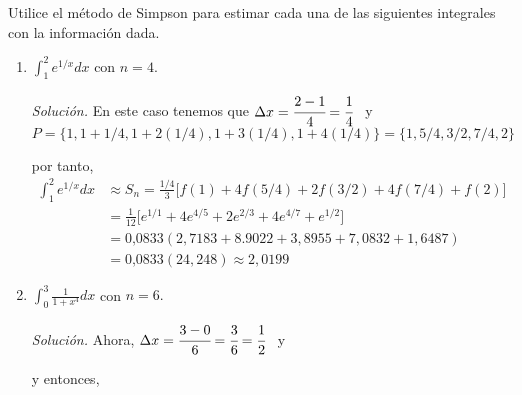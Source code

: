 \begin{ejemplo}
\textnormal{Utilice el método de Simpson para estimar cada una de las siguientes integrales con la información dada.}
\end{ejemplo}
\begin{enumerate}[leftmargin=1.2em,   itemindent=0pt,       labelwidth=\labelwidth,labelsep=0.5em,]
	
\item $\displaystyle\int_{1}^{2}e^{1/x}dx$ con $n=4.$

\textit{Solución.} En este caso tenemos que $\Delta x=\cfrac{2-1}{4}=\cfrac{1}{4}$ \ y
{\small
\[
P=\{1,1+1/4,1+2(1/4),1+3(1/4),1+4(1/4)\}=\{1,5/4,3/2,7/4,2\}
\]
}

por tanto,
{\small
\begin{align*}
\int_{1}^{2}e^{1/x}dx&\approx S_{n}=\frac{1/4}{3}\Big[
f(1)+4f(5/4)+2f(3/2)+4f(7/4)+f(2)\Big]\\
&=\frac{1}{12}\Big[ e^{1/1}+4e^{4/5}+2e^{2/3}+4e^{4/7}+e^{1/2}\Big]\\
&=0\text{,}0833(2,\allowbreak 7183+8.\allowbreak9022+3,\allowbreak 8955+7,\allowbreak 0832+1,\allowbreak 6487)\\
&=0\text{,}0833(24,\allowbreak 248)\approx\allowbreak 2,0199
\end{align*}
}

\item $\displaystyle\int_{0}^{3}\frac{1}{1+x^{4}}dx$ con $n=6.$

\textit{Solución.} Ahora, $\Delta x=\cfrac{3-0}{6}=\cfrac{3}{6}=\cfrac{1}{2}$ \ y



y entonces,





\end{enumerate}
